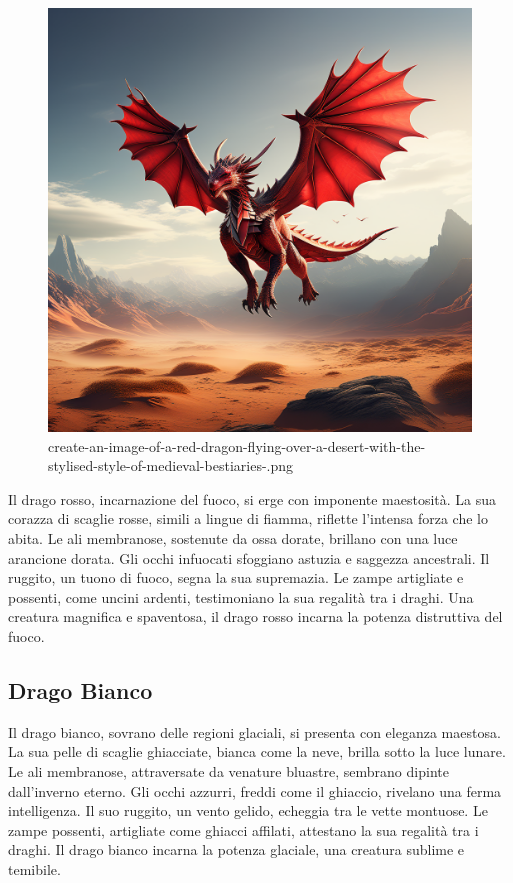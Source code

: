 \begin{figure}
\centering
\includegraphics{create-an-image-of-a-red-dragon-flying-over-a-desert-with-the-stylised-style-of-medieval-bestiaries-.png}
\caption{create-an-image-of-a-red-dragon-flying-over-a-desert-with-the-stylised-style-of-medieval-bestiaries-.png}
\end{figure}

Il drago rosso, incarnazione del fuoco, si erge con imponente
maestosità. La sua corazza di scaglie rosse, simili a lingue di fiamma,
riflette l'intensa forza che lo abita. Le ali membranose, sostenute da
ossa dorate, brillano con una luce arancione dorata. Gli occhi infuocati
sfoggiano astuzia e saggezza ancestrali. Il ruggito, un tuono di fuoco,
segna la sua supremazia. Le zampe artigliate e possenti, come uncini
ardenti, testimoniano la sua regalità tra i draghi. Una creatura
magnifica e spaventosa, il drago rosso incarna la potenza distruttiva
del fuoco.

\subsection{Drago Bianco}\label{drago-bianco}

Il drago bianco, sovrano delle regioni glaciali, si presenta con
eleganza maestosa. La sua pelle di scaglie ghiacciate, bianca come la
neve, brilla sotto la luce lunare. Le ali membranose, attraversate da
venature bluastre, sembrano dipinte dall'inverno eterno. Gli occhi
azzurri, freddi come il ghiaccio, rivelano una ferma intelligenza. Il
suo ruggito, un vento gelido, echeggia tra le vette montuose. Le zampe
possenti, artigliate come ghiacci affilati, attestano la sua regalità
tra i draghi. Il drago bianco incarna la potenza glaciale, una creatura
sublime e temibile.

